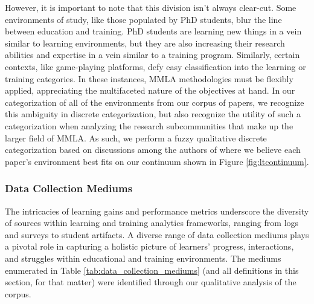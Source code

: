 \documentclass[manuscript,screen,review]{acmart}
\begin{document}
However, it is important to note that this division isn't always clear-cut. Some environments of study, like those populated by PhD students, blur the line between education and training. PhD students are learning new things in a vein similar to learning environments, but they are also increasing their research abilities and expertise in a vein similar to a training program. Similarly, certain contexts, like game-playing platforms, defy easy classification into the learning or training categories. In these instances, MMLA methodologies must be flexibly applied, appreciating the multifaceted nature of the objectives at hand. In our categorization of all of the environments from our corpus of papers, we recognize this ambiguity in discrete categorization, but also recognize the utility of such a categorization when analyzing the research subcommunities that make up the larger field of MMLA. As such, we perform a fuzzy qualitative discrete categorization based on discussions among the authors of where we believe each paper’s environment best fits on our continuum shown in Figure \ref{fig:ltcontinuum}.

\subsubsection{Data Collection Mediums} \label{subsec:data_collection_mediums}

The intricacies of learning gains and performance metrics underscore the diversity of sources within learning and training analytics frameworks, ranging from logs and surveys to student artifacts. A diverse range of data collection mediums plays a pivotal role in capturing a holistic picture of learners' progress, interactions, and struggles within educational and training environments. The mediums enumerated in Table \ref{tab:data_collection_mediums} (and all definitions in this section, for that matter) were identified through our qualitative analysis of the corpus.
\end{document}
